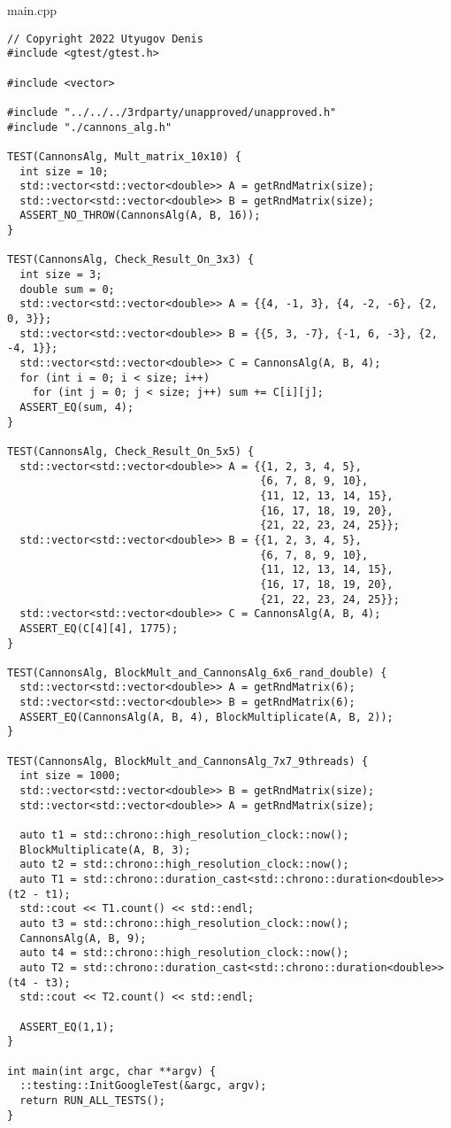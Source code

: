\documentclass{report}
\begin{document}
main.cpp
\begin{lstlisting}
// Copyright 2022 Utyugov Denis
#include <gtest/gtest.h>

#include <vector>

#include "../../../3rdparty/unapproved/unapproved.h"
#include "./cannons_alg.h"

TEST(CannonsAlg, Mult_matrix_10x10) {
  int size = 10;
  std::vector<std::vector<double>> A = getRndMatrix(size);
  std::vector<std::vector<double>> B = getRndMatrix(size);
  ASSERT_NO_THROW(CannonsAlg(A, B, 16));
}

TEST(CannonsAlg, Check_Result_On_3x3) {
  int size = 3;
  double sum = 0;
  std::vector<std::vector<double>> A = {{4, -1, 3}, {4, -2, -6}, {2, 0, 3}};
  std::vector<std::vector<double>> B = {{5, 3, -7}, {-1, 6, -3}, {2, -4, 1}};
  std::vector<std::vector<double>> C = CannonsAlg(A, B, 4);
  for (int i = 0; i < size; i++)
    for (int j = 0; j < size; j++) sum += C[i][j];
  ASSERT_EQ(sum, 4);
}

TEST(CannonsAlg, Check_Result_On_5x5) {
  std::vector<std::vector<double>> A = {{1, 2, 3, 4, 5},
                                        {6, 7, 8, 9, 10},
                                        {11, 12, 13, 14, 15},
                                        {16, 17, 18, 19, 20},
                                        {21, 22, 23, 24, 25}};
  std::vector<std::vector<double>> B = {{1, 2, 3, 4, 5},
                                        {6, 7, 8, 9, 10},
                                        {11, 12, 13, 14, 15},
                                        {16, 17, 18, 19, 20},
                                        {21, 22, 23, 24, 25}};
  std::vector<std::vector<double>> C = CannonsAlg(A, B, 4);
  ASSERT_EQ(C[4][4], 1775);
}

TEST(CannonsAlg, BlockMult_and_CannonsAlg_6x6_rand_double) {
  std::vector<std::vector<double>> A = getRndMatrix(6);
  std::vector<std::vector<double>> B = getRndMatrix(6);
  ASSERT_EQ(CannonsAlg(A, B, 4), BlockMultiplicate(A, B, 2));
}

TEST(CannonsAlg, BlockMult_and_CannonsAlg_7x7_9threads) {
  int size = 1000;
  std::vector<std::vector<double>> B = getRndMatrix(size);
  std::vector<std::vector<double>> A = getRndMatrix(size);
  
  auto t1 = std::chrono::high_resolution_clock::now();
  BlockMultiplicate(A, B, 3);
  auto t2 = std::chrono::high_resolution_clock::now();
  auto T1 = std::chrono::duration_cast<std::chrono::duration<double>>(t2 - t1);
  std::cout << T1.count() << std::endl;
  auto t3 = std::chrono::high_resolution_clock::now();
  CannonsAlg(A, B, 9);
  auto t4 = std::chrono::high_resolution_clock::now();
  auto T2 = std::chrono::duration_cast<std::chrono::duration<double>>(t4 - t3);
  std::cout << T2.count() << std::endl;
  
  ASSERT_EQ(1,1);
}

int main(int argc, char **argv) {
  ::testing::InitGoogleTest(&argc, argv);
  return RUN_ALL_TESTS();
}

\end{lstlisting}
\end{document}
